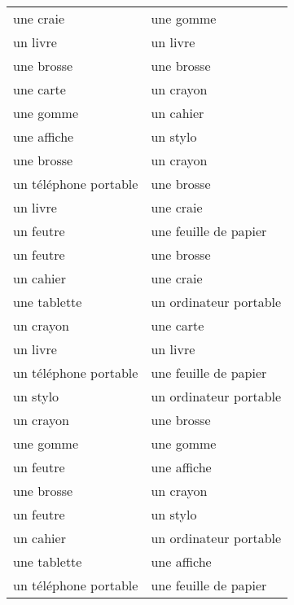 \documentclass{article}
\date{}
\begin{document}
  \centering
  \noindent
  {\LARGE
    \begin{tabular}{| p{} | p{} |}
      \hline
      une craie             & une gomme \\
      un livre              & un livre \\
      une brosse            & une brosse \\
      une carte             & un crayon \\
      une gomme             & un cahier \\
      \hline
      une affiche           & un stylo \\
      une brosse            & un crayon \\
      un téléphone portable & une brosse \\
      un livre              & une craie \\
      un feutre             & une feuille de papier \\
      \hline
      un feutre             & une brosse \\
      un cahier             & une craie \\
      une tablette          & un ordinateur portable \\
      un crayon             & une carte \\
      un livre              & un livre \\
      \hline
      un téléphone portable & une feuille de papier \\
      un stylo              & un ordinateur portable \\
      un crayon             & une brosse \\
      une gomme             & une gomme \\
      un feutre             & une affiche \\
      \hline
      une brosse            & un crayon \\
      un feutre             & un stylo \\
      un cahier             & un ordinateur portable \\
      une tablette          & une affiche \\
      un téléphone portable & une feuille de papier \\
      \hline
    \end{tabular}
  }
\end{document}
